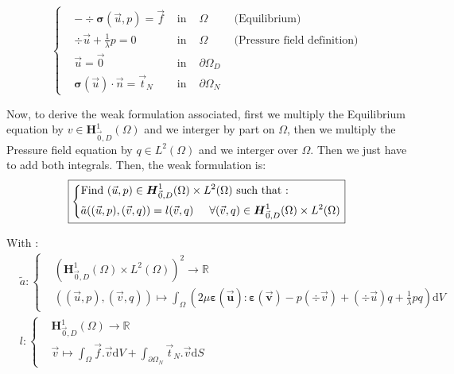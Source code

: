 \documentclass[a4paper,12pt,twoside]{report}
\newcommand{\mtr}{\mathbb{R}}
\newcommand{\dif}{\mathrm{d}}
\begin{document}
\begin{equation}
	\label{eq:strong_pressure_disp_form}
	\left \{
	\begin{aligned}
		& - \div \boldsymbol{\sigma} (\vec u,p) = \vec f & \text{ in } & \Omega \hspace{1cm} \text{(Equilibrium)}\\
		& \div{\vec u} + \frac{1}{\lambda} p = 0 & \text{ in } & \Omega \hspace{1cm} \text{(Pressure field definition)} \\
		& \vec u = \vec 0 & \text{ in } &\partial \Omega_D \\
		& \boldsymbol{\sigma} (\vec u) \cdot \vec n = \vec t_N & \text{ in }& \partial \Omega_N
	\end{aligned}
	\right.
\end{equation}

Now, to derive the weak formulation associated, first we multiply the Equilibrium equation by $v \in \boldsymbol H^1_{\vec 0,D}(\Omega)$ and we interger by part on $\Omega$, then we multiply the Pressure field equation by $q \in L^2(\Omega)$ and we interger over $\Omega$. Then we just have to add both integrals. 
Then, the weak formulation is: 
\begin{equation}
	\label{eq:weak_pressure_displ_form}
	\boxed{
		\left\{
		\begin{aligned}
			&\text{Find } (\vec u,p) \in \boldsymbol H^1_{\vec 0,D}(\Omega) \times L^2(\Omega) \text{ such that :}\\
			& \tilde{a}((\vec u,p),(\vec v,q)) = l(\vec v,q) \hspace{0.5cm} \forall (\vec v,q) \in \boldsymbol H^1_{\vec 0,D}(\Omega) \times L^2(\Omega)
		\end{aligned}
		\right.
	}
\end{equation}

With : 
\begin{equation*}
	\begin{aligned}
		& \tilde{a} : \left\{
		\begin{aligned}
			&\left( \boldsymbol H^1_{\vec 0,D}(\Omega) \times L^2(\Omega) \right)^2 \rightarrow \mtr \\
			&((\vec u,p),(\vec v,q))  \longmapsto \int_\Omega \left( 2\mu \boldsymbol{\varepsilon(\vec u)} : \boldsymbol{\varepsilon(\vec v)} - p (\div \vec v) + (\div \vec u)q + \frac{1}{\lambda} pq \right) \dif V
		\end{aligned}
		\right. \\[0.3cm]
		& l : \left\{
		\begin{aligned}
			&\boldsymbol H^1_{\vec 0,D}(\Omega) \rightarrow \mtr \\
			&\vec v \longmapsto \int_\Omega \vec f . \vec v \dif V + \int_{\partial\Omega_N} \vec t_N.\vec v \dif S
		\end{aligned}
		\right.
	\end{aligned}
\end{equation*}
\end{document}

